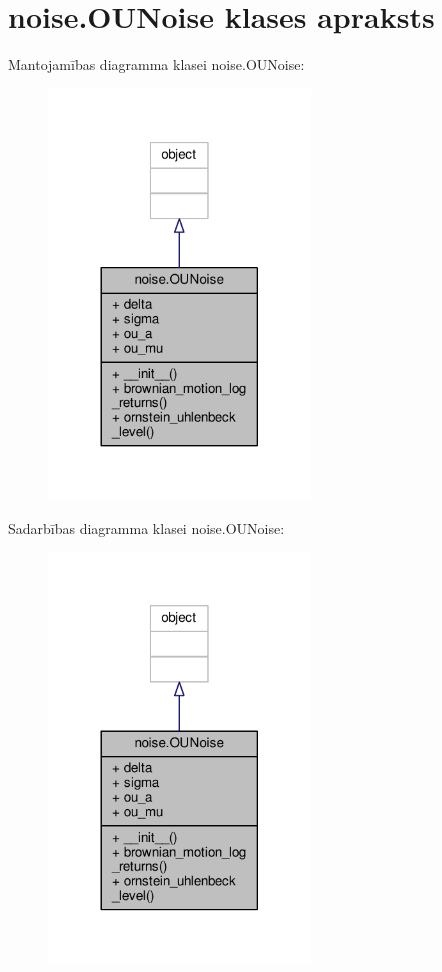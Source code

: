 \hypertarget{classnoise_1_1_o_u_noise}{}\section{noise.\+O\+U\+Noise klases apraksts}
\label{classnoise_1_1_o_u_noise}


Mantojamības diagramma klasei noise.\+O\+U\+Noise\+:
\nopagebreak
\begin{figure}[H]
\begin{center}
\leavevmode
\includegraphics[width=197pt]{classnoise_1_1_o_u_noise__inherit__graph}
\end{center}
\end{figure}


Sadarbības diagramma klasei noise.\+O\+U\+Noise\+:
\nopagebreak
\begin{figure}[H]
\begin{center}
\leavevmode
\includegraphics[width=197pt]{classnoise_1_1_o_u_noise__coll__graph}
\end{center}
\end{figure}
